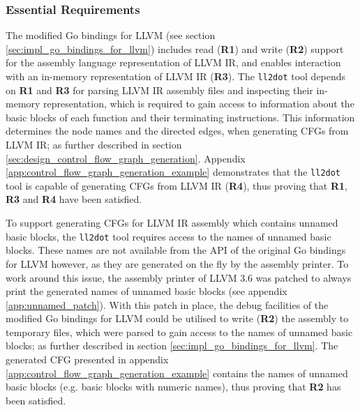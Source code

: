 
\subsubsection{Essential Requirements}
\label{sec:eval_llvm_ir_library_essential_requirements}


The modified Go bindings for LLVM (see section \ref{sec:impl_go_bindings_for_llvm}) includes read (\textbf{R1}) and write (\textbf{R2}) support for the assembly language representation of LLVM IR, and enables interaction with an in-memory representation of LLVM IR (\textbf{R3}). The \texttt{ll2dot} tool depends on \textbf{R1} and \textbf{R3} for parsing LLVM IR assembly files and inspecting their in-memory representation, which is required to gain access to information about the basic blocks of each function and their terminating instructions. This information determines the node names and the directed edges, when generating CFGs from LLVM IR; as further described in section \ref{sec:design_control_flow_graph_generation}. Appendix \ref{app:control_flow_graph_generation_example} demonstrates that the \texttt{ll2dot} tool is capable of generating CFGs from LLVM IR (\textbf{R4}), thus proving that \textbf{R1}, \textbf{R3} and \textbf{R4} have been satisfied.


To support generating CFGs for LLVM IR assembly which contains unnamed basic blocks, the \texttt{ll2dot} tool requires access to the names of unnamed basic blocks. These names are not available from the API of the original Go bindings for LLVM however, as they are generated on the fly by the assembly printer. To work around this issue, the assembly printer of LLVM 3.6 was patched to always print the generated names of unnamed basic blocks (see appendix \ref{app:unnamed_patch}). With this patch in place, the debug facilities of the modified Go bindings for LLVM could be utilised to write (\textbf{R2}) the assembly to temporary files, which were parsed to gain access to the names of unnamed basic blocks; as further described in section \ref{sec:impl_go_bindings_for_llvm}. The generated CFG presented in appendix \ref{app:control_flow_graph_generation_example} contains the names of unnamed basic blocks (e.g. basic blocks with numeric names), thus proving that \textbf{R2} has been satisfied.
